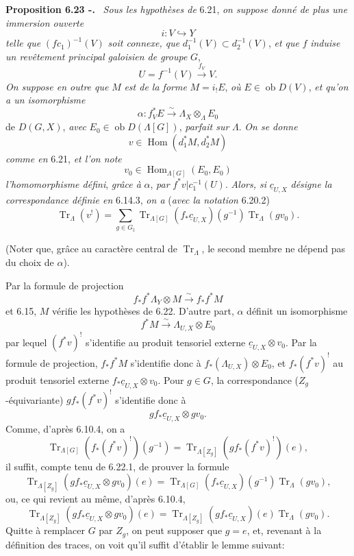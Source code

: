 \documentclass[11pt]{article}
\newenvironment{statement}[1]{\par\medskip\noindent\textbf{#1.}\ }{\par\medskip}
\DeclareMathOperator{\Hom}{Hom}
\providecommand{\Tr}{\operatorname{Tr}}
\providecommand{\Tr}{\operatorname{Tr}}
\providecommand{\Ob}{\operatorname{ob}}
\providecommand{\Tr}{\operatorname{Tr}}
\providecommand{\Hom}{\operatorname{Hom}}
\providecommand{\Ob}{\operatorname{ob}}
\providecommand{\Tr}{\operatorname{Tr}}
\providecommand{\Ob}{\operatorname{Ob}}
\providecommand{\Hom}{\operatorname{Hom}}
\providecommand{\Tr}{\operatorname{Tr}}
\providecommand{\Ob}{\operatorname{ob}}
\providecommand{\Ob}{\operatorname{Ob}}
\begin{document}
\begin{statement}{Proposition 6.23 -}
\emph{Sous les hypothèses de} 6.21, \emph{on suppose donné de plus une immersion ouverte}
\[
i:V\hookrightarrow Y
\]
\emph{telle que} $(fc_1)^{-1}(V)$ \emph{soit connexe, que} 
$d_1^{-1}(V)\subset d_2^{-1}(V)$, \emph{et que} $f$
\emph{induise un revêtement principal galoisien de groupe} $G$,
\[
U=f^{-1}(V)\xrightarrow{f_V}V.
\]
\emph{On suppose en outre que} $M$ \emph{est de la forme} $M=i_!E$, \emph{où} $E\in\Ob D(V)$, \emph{et qu'on a un isomorphisme}
\[
\alpha:f_V^*E\xrightarrow{\sim}\Lambda_X\otimes_{\Lambda}E_0
\]
de $D(G,X)$, \emph{avec} $E_0\in\Ob D(\Lambda[G])$, \emph{parfait sur} $\Lambda$. \emph{On se donne}
\[
v\in\Hom(d_1^*M,d_2^*M)
\]
\emph{comme en} 6.21, \emph{et l'on note}
\[
v_0\in\Hom_{\Lambda[G]}(E_0,E_0)
\]
\emph{l'homomorphisme défini}, \emph{grâce à} $\alpha$, \emph{par} $f^*v|c_1^{-1}(U)$. \emph{Alors, si} $\underline c_{U,X}$ \emph{désigne la correspondance définie en} 6.14.3, \emph{on a} (\emph{avec la notation} 6.20.2)
\begin{equation}
\Tr_{\Lambda}(v^!)
=
\sum_{g\in G_{\natural}}
\Tr_{\Lambda[G]}(f_*\underline c_{U,X})(g^{-1})\Tr_{\Lambda}(gv_0).
\tag{6.23.1}
\end{equation}
\end{statement}

(Noter que, grâce au caractère central de $\Tr_{\Lambda}$, le second membre ne dépend pas du choix de $\alpha$).

Par la formule de projection
\[
f_*f^*\Lambda_Y\otimes M\xrightarrow{\sim}f_*f^*M
\]
et 6.15, $M$ vérifie les hypothèses de 6.22. D'autre part, $\alpha$ définit un isomorphisme
\[
f^*M\xrightarrow{\sim}\Lambda_{U,X}\otimes E_0
\]
par lequel $(f^*v)^!$ s'identifie au produit tensoriel externe $\underline c_{U,X}\otimes v_0$. Par la formule de projection, $f_*f^*M$ s'identifie donc à $f_*(\Lambda_{U,X})\otimes E_0$, et $f_*(f^*v)^!$ au produit tensoriel externe $f_*\underline c_{U,X}\otimes v_0$. Pour $g\in G$, la correspondance ($Z_g$-équivariante) $gf_*(f^*v)^!$ s'identifie donc à
\[
gf_*\underline c_{U,X}\otimes gv_0.
\]
Comme, d'après 6.10.4, on a
\[
\Tr_{\Lambda[G]}(f_*(f^*v)^!)(g^{-1})
=
\Tr_{\Lambda[Z_g]}(gf_*(f^*v)^!)(e),
\]
il suffit, compte tenu de 6.22.1, de prouver la formule
\[
\Tr_{\Lambda[Z_g]}(gf_*\underline c_{U,X}\otimes gv_0)(e)
=
\Tr_{\Lambda[G]}(f_*\underline c_{U,X})(g^{-1})\Tr_{\Lambda}(gv_0),
\]
ou, ce qui revient au même, d'après 6.10.4,
\begin{equation}
\Tr_{\Lambda[Z_g]}(gf_*\underline c_{U,X}\otimes gv_0)(e)
=
\Tr_{\Lambda[Z_g]}(gf_*\underline c_{U,X})(e)\Tr_{\Lambda}(gv_0).
\tag{6.23.2}
\end{equation}
Quitte à remplacer $G$ par $Z_g$, on peut supposer que $g=e$, et, revenant à la définition des traces, on voit qu'il suffit d'établir le lemme suivant:
\end{document}

